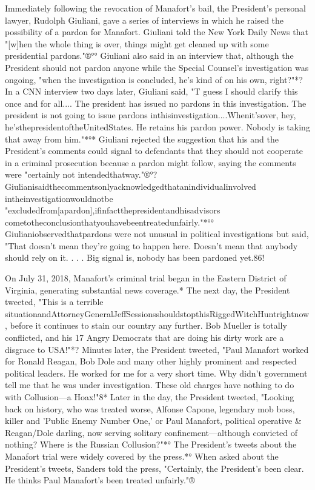 Immediately following the revocation of Manafort's bail, the President's personal lawyer, Rudolph Giuliani, gave a series of interviews in which he raised the possibility of a pardon for Manafort.
Giuliani told the New York Daily News that "[w]hen the whole thing is over, things might get cleaned up with some presidential pardons."®°°
Giuliani also said in an interview that, although the President should not pardon anyone while the Special Counsel's investigation was ongoing, "when the investigation is concluded, he's kind of on his own, right?"*?
In a CNN interview two days later, Giuliani said, "T guess I should clarify this once and for all....
The president has issued no pardons in this investigation.
The president is not going to issue pardons inthisinvestigation....Whenit'sover, hey, he'sthepresidentoftheUnitedStates.
He retains his pardon power.
Nobody is taking that away from him."*°*
Giuliani rejected the suggestion that his and the President's comments could signal to defendants that they should not cooperate in a criminal prosecution because a pardon might follow, saying the comments were "certainly not intendedthatway."®°? Giulianisaidthecommentsonlyacknowledgedthatanindividualinvolved intheinvestigationwouldnotbe "excludedfrom[apardon],ifinfactthepresidentandhisadvisors
cometotheconclusionthatyouhavebeentreatedunfairly."*°°
Giulianiobservedthatpardons were not unusual in political investigations but said, "That doesn't mean they're going to happen here.
Doesn't mean that anybody should rely on it. . . .
Big signal is, nobody has been pardoned yet.86!

On July 31, 2018, Manafort's criminal trial began in the Eastern District of Virginia, generating substantial news coverage.*
The next day, the President tweeted, "This is a terrible situationandAttorneyGeneralJeffSessionsshouldstopthisRiggedWitchHuntrightnow, before it continues to stain our country any further.
Bob Mueller is totally conflicted, and his 17 Angry Democrats that are doing his dirty work are a disgrace to USA!"*?
Minutes later, the President tweeted, "Paul Manafort worked for Ronald Reagan, Bob Dole and many other highly prominent and respected political leaders.
He worked for me for a very short time.
Why didn't government tell me that he was under investigation.
These old charges have nothing to do with Collusion—a Hoax!"8*
Later in the day, the President tweeted, "Looking back on history, who was treated worse, Alfonse Capone, legendary mob boss, killer and 'Public Enemy Number One,' or Paul Manafort, political operative & Reagan/Dole darling, now serving solitary confinement—although convicted of nothing?
Where is the Russian Collusion?"*°
The President's tweets about the Manafort trial were widely covered by the press.*°
When asked about the President's tweets, Sanders told the press, "Certainly, the President's been clear.
He thinks Paul Manafort's been treated unfairly."®%

